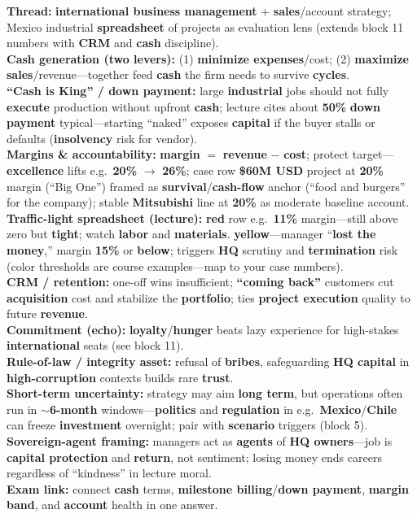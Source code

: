 \documentclass[10pt,a4paper]{article}
\begin{document}
{
\textbf{Thread:} \textbf{international business management} + \textbf{sales}/account strategy; Mexico industrial \textbf{spreadsheet} of projects as evaluation lens (extends block 11 numbers with \textbf{CRM} and \textbf{cash} discipline).\\
\textbf{Cash generation (two levers):} (1) \textbf{minimize expenses}/cost; (2) \textbf{maximize sales}/revenue---together feed \textbf{cash} the firm needs to survive \textbf{cycles}.\\
\textbf{``Cash is King'' / down payment:} large \textbf{industrial} jobs should not fully \textbf{execute} production without upfront \textbf{cash}; lecture cites about \textbf{50\%} \textbf{down payment} typical---starting ``naked'' exposes \textbf{capital} if the buyer stalls or defaults (\textbf{insolvency} risk for vendor).\\
\textbf{Margins \& accountability:} \textbf{margin} $=$ \textbf{revenue} $-$ \textbf{cost}; protect target---\textbf{excellence} lifts e.g.\ \textbf{20\%} $\rightarrow$ \textbf{26\%}; case row \textbf{\$60M USD} project at \textbf{20\%} margin (``Big One'') framed as \textbf{survival}/\textbf{cash-flow} anchor (``food and burgers'' for the company); stable \textbf{Mitsubishi} line at \textbf{20\%} as moderate baseline account.\\
\textbf{Traffic-light spreadsheet (lecture):} \textbf{red} row e.g.\ \textbf{11\%} margin---still above zero but \textbf{tight}; watch \textbf{labor} and \textbf{materials}. \textbf{yellow}---manager ``\textbf{lost the money},'' margin \textbf{15\%} or \textbf{below}; triggers \textbf{HQ} scrutiny and \textbf{termination} risk (color thresholds are course examples---map to your case numbers).\\
\textbf{CRM / retention:} one-off wins insufficient; \textbf{``coming back''} customers cut \textbf{acquisition} cost and stabilize the \textbf{portfolio}; ties \textbf{project execution} quality to future \textbf{revenue}.\\
\textbf{Commitment (echo):} \textbf{loyalty}/\textbf{hunger} beats lazy experience for high-stakes \textbf{international} seats (see block 11).\\
\textbf{Rule-of-law / integrity asset:} refusal of \textbf{bribes}, safeguarding \textbf{HQ capital} in \textbf{high-corruption} contexts builds rare \textbf{trust}.\\
\textbf{Short-term uncertainty:} strategy may aim \textbf{long term}, but operations often run in $\sim$\textbf{6-month} windows---\textbf{politics} and \textbf{regulation} in e.g.\ \textbf{Mexico}/\textbf{Chile} can freeze \textbf{investment} overnight; pair with \textbf{scenario} triggers (block 5).\\
\textbf{Sovereign-agent framing:} managers act as \textbf{agents} of \textbf{HQ owners}---job is \textbf{capital protection} and \textbf{return}, not sentiment; losing money ends careers regardless of ``kindness'' in lecture moral.\\
\textbf{Exam link:} connect \textbf{cash} terms, \textbf{milestone billing}/\textbf{down payment}, \textbf{margin band}, and \textbf{account} health in one answer.
}
\end{document}
